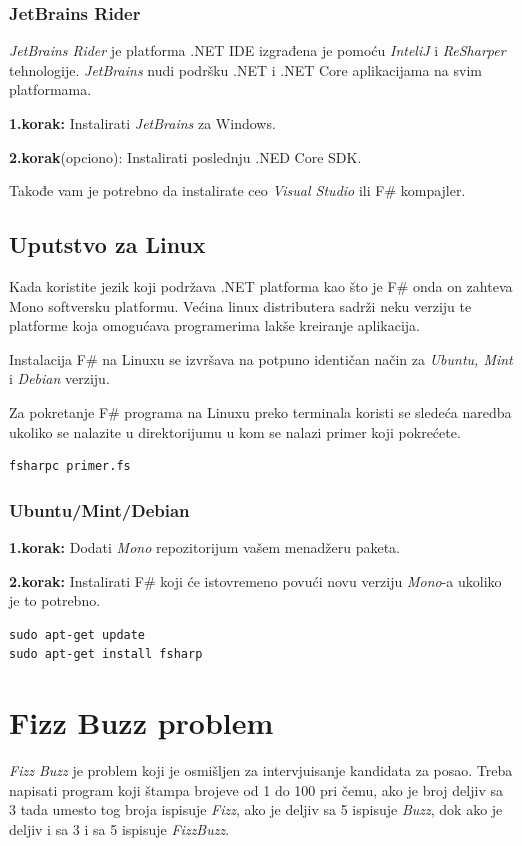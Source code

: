 \documentclass[a4paper]{article}
\begin{document}
\subsubsection{JetBrains Rider}

{\em JetBrains Rider} je platforma .NET IDE izgrađena je pomoću {\em InteliJ} i {\em ReSharper} tehnologije. {\em JetBrains} nudi podršku .NET i .NET Core aplikacijama na svim platformama.

\textbf{1.korak:} Instalirati {\em JetBrains} za Windows.

\textbf{2.korak}(opciono): Instalirati poslednju .NED Core SDK.

Takođe vam je potrebno da instalirate ceo {\em Visual Studio} ili F\# kompajler.


\subsection{Uputstvo za Linux}

Kada koristite jezik koji podržava .NET platforma kao što je F\# onda on zahteva Mono\cite{mono} softversku platformu. Većina linux distributera sadrži neku verziju te platforme koja omogućava programerima lakše kreiranje aplikacija. 

Instalacija F\# na Linuxu se izvršava na potpuno identičan način za {\em Ubuntu, Mint} i {\em Debian} verziju.

Za pokretanje F\# programa na Linuxu preko terminala koristi se sledeća naredba ukoliko se nalazite u direktorijumu u kom se nalazi primer koji pokrećete.
\\
\begin{lstlisting}
fsharpc primer.fs
\end{lstlisting}

\subsubsection{Ubuntu/Mint/Debian}

\textbf{1.korak:} Dodati {\em Mono}\cite{mono} repozitorijum vašem menadžeru paketa.

\textbf{2.korak:} Instalirati F\# koji će istovremeno povući novu verziju {\em Mono}-a ukoliko je to potrebno.
\\
\begin{lstlisting}
sudo apt-get update
sudo apt-get install fsharp
\end{lstlisting}
 
\section{Fizz Buzz problem}
\textit{Fizz Buzz} je problem koji je osmišljen za intervjuisanje kandidata za posao. Treba napisati program koji štampa brojeve od 1 do 100 pri čemu, ako je broj deljiv sa 3 tada umesto tog broja ispisuje \textit{Fizz}, ako je deljiv sa 5 ispisuje \textit{Buzz}, dok ako je deljiv i sa 3 i sa 5 ispisuje \textit{FizzBuzz}.
\end{document}
